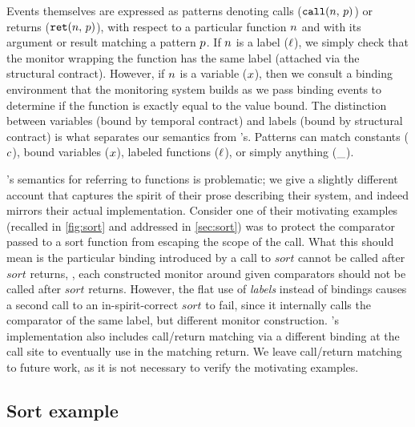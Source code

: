 Events themselves are expressed as patterns denoting calls (${\tt call}(n,\, p)$) or returns (${\tt ret}(n,\, p)$), with respect to a particular function $n$ and with its argument or result matching a pattern $p$.
%
If $n$ is a label ($\ell$), we simply check that the monitor wrapping the function has the same label (attached via the structural contract).
%
However, if $n$ is a variable ($x$), then we consult a binding environment that the monitoring system builds as we pass binding events to determine if the function is exactly equal to the value bound.
%
The distinction between variables (bound by temporal contract) and labels (bound by structural contract) is what separates our semantics from \citeauthor{ianjohnson:dfm:icfp2011}'s.
%
Patterns can match constants ($c$), bound variables ($x$), labeled functions ($\ell$), or simply anything ($\_$).

\citeauthor{ianjohnson:dfm:icfp2011}'s semantics for referring to functions is problematic; we give a slightly different account that captures the spirit of their prose describing their system, and indeed mirrors their actual implementation.
%
Consider one of their motivating examples (recalled in \autoref{fig:sort} and addressed in \autoref{sec:sort}) was to protect the comparator passed to a sort function from escaping the scope of the call.
%
What this should mean is the particular binding introduced by a call to $sort$ cannot be called after $sort$ returns, \ie, each constructed monitor around given comparators should not be called after $sort$ returns.
%
However, the flat use of \emph{labels} instead of bindings causes a second call to an in-spirit-correct $sort$ to fail, since it internally calls the comparator of the same label, but different monitor construction.
%
\citeauthor{ianjohnson:dfm:icfp2011}'s implementation also includes call/return matching via a different binding at the call site to eventually use in the matching return.
%
We leave call/return matching to future work, as it is not necessary to verify the motivating examples.

\subsection{Sort example} \label{sec:sort}

